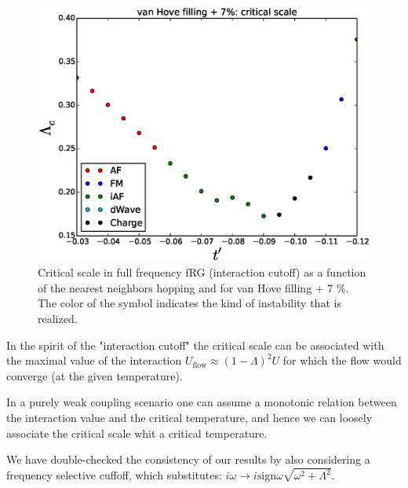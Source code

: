 \begin{figure}
\includegraphics[scale=0.7]{vanHove_plus_scan_critical_lambda_phi.eps}
\caption{Critical scale in full frequency fRG (interaction cutoff) as a function of the nearest neighbors hopping and for van Hove filling + 7 \%. The color of the symbol indicates the kind of instability that is realized.} 
\label{phasediag_van_hove_plus} 
\end{figure}



In the spirit of the "interaction cutoff" the critical scale can be associated with the maximal value of the interaction $U_{\mathrm{flow}}\approx(1-\Lambda)^2 U$  for which the flow would converge (at the given temperature). 

In a purely weak coupling scenario one can assume a monotonic relation between the interaction value and the critical temperature, and hence we can loosely associate the critical scale whit a critical temperature.

We have double-checked the consistency of our results by also considering a frequency selective cuffoff, which substitutes: $i\omega \rightarrow i\mathrm{sign} \omega \sqrt{\omega^2+\Lambda^2}$. 

